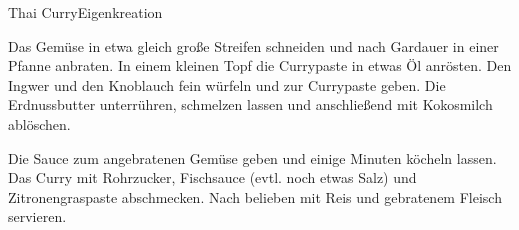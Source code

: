 \begin{recipe}{Thai Curry}{Eigenkreation}
  \label{Curry}
  \inglist

  \steps

  Das Gemüse in etwa gleich große Streifen schneiden und nach Gardauer in einer
  Pfanne anbraten. In einem kleinen Topf die Currypaste in etwas Öl anrösten.
  Den Ingwer und den Knoblauch fein würfeln und zur Currypaste geben. Die
  Erdnussbutter unterrühren, schmelzen lassen und anschließend mit Kokosmilch
  ablöschen. 
  
  Die Sauce zum angebratenen Gemüse geben und einige Minuten köcheln lassen.
  Das Curry mit Rohrzucker, Fischsauce (evtl. noch etwas Salz) und
  Zitronengraspaste abschmecken. Nach belieben mit Reis und gebratenem Fleisch
  servieren.

\end{recipe}